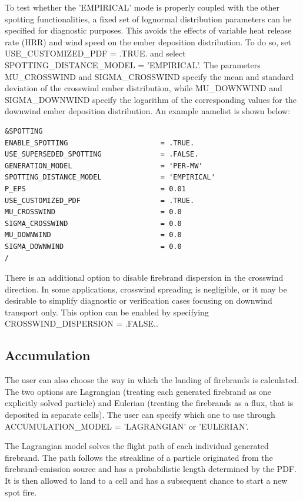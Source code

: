 To test whether the 'EMPIRICAL' mode is properly coupled with the other spotting functionalities, a fixed set of lognormal distribution parameters can be specified for diagnostic purposes. This avoids the effects of variable heat release rate (HRR) and wind speed on the ember deposition distribution. To do so, set USE\_CUSTOMIZED\_PDF = .TRUE. and select SPOTTING\_DISTANCE\_MODEL = 'EMPIRICAL'. The parameters MU\_CROSSWIND and SIGMA\_CROSSWIND specify the mean and standard deviation of the crosswind ember distribution, while MU\_DOWNWIND and SIGMA\_DOWNWIND specify the logarithm of the corresponding values for the downwind ember deposition distribution. An example namelist is shown below:

\begin{verbatim}
&SPOTTING
ENABLE_SPOTTING 					 = .TRUE.
USE_SUPERSEDED_SPOTTING 			 = .FALSE.
GENERATION_MODEL                     = 'PER-MW'
SPOTTING_DISTANCE_MODEL              = 'EMPIRICAL'
P_EPS                                = 0.01
USE_CUSTOMIZED_PDF                   = .TRUE.
MU_CROSSWIND                         = 0.0
SIGMA_CROSSWIND                      = 0.0
MU_DOWNWIND                          = 0.0
SIGMA_DOWNWIND                       = 0.0
/
\end{verbatim}

There is an additional option to disable firebrand dispersion in the crosswind direction. In some applications, crosswind spreading is negligible, or it may be desirable to simplify diagnostic or verification cases focusing on downwind transport only. This option can be enabled by specifying CROSSWIND\_DISPERSION = .FALSE..

\subsection{Accumulation}
\label{ember_accumulation}

The user can also choose the way in which the landing of firebrands is calculated. The two options are Lagrangian (treating each generated firebrand as one explicitly solved particle) and Eulerian (treating the firebrands as a flux, that is deposited in separate cells). The user can specify which one to use through ACCUMULATION\_MODEL = 'LAGRANGIAN' or 'EULERIAN'.

The Lagrangian model solves the flight path of each individual generated firebrand. The path follows the streakline of a particle originated from the firebrand-emission source and has a probabilistic length determined by the PDF. It is then allowed to land to a cell and has a subsequent chance to start a new spot fire.

